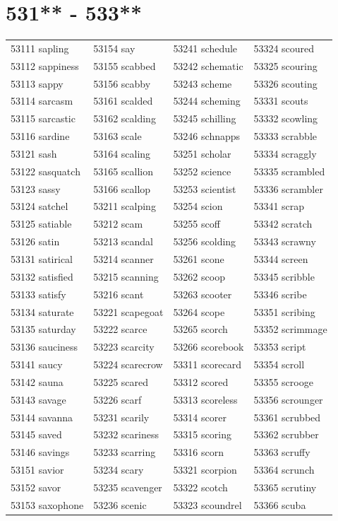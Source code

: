 \documentclass[10pt, oneside]{book}
\begin{document}
\begin{table}
	\centering
	\section*{531** - 533**}
	\begin{tabular}{l l l l}
53111 sapling &53154 say &53241 schedule &53324 scoured\\
53112 sappiness &53155 scabbed &53242 schematic &53325 scouring\\
53113 sappy &53156 scabby &53243 scheme &53326 scouting\\
53114 sarcasm &53161 scalded &53244 scheming &53331 scouts\\
53115 sarcastic &53162 scalding &53245 schilling &53332 scowling\\
53116 sardine &53163 scale &53246 schnapps &53333 scrabble\\
53121 sash &53164 scaling &53251 scholar &53334 scraggly\\
53122 sasquatch &53165 scallion &53252 science &53335 scrambled\\
53123 sassy &53166 scallop &53253 scientist &53336 scrambler\\
53124 satchel &53211 scalping &53254 scion &53341 scrap\\
53125 satiable &53212 scam &53255 scoff &53342 scratch\\
53126 satin &53213 scandal &53256 scolding &53343 scrawny\\
53131 satirical &53214 scanner &53261 scone &53344 screen\\
53132 satisfied &53215 scanning &53262 scoop &53345 scribble\\
53133 satisfy &53216 scant &53263 scooter &53346 scribe\\
53134 saturate &53221 scapegoat &53264 scope &53351 scribing\\
53135 saturday &53222 scarce &53265 scorch &53352 scrimmage\\
53136 sauciness &53223 scarcity &53266 scorebook &53353 script\\
53141 saucy &53224 scarecrow &53311 scorecard &53354 scroll\\
53142 sauna &53225 scared &53312 scored &53355 scrooge\\
53143 savage &53226 scarf &53313 scoreless &53356 scrounger\\
53144 savanna &53231 scarily &53314 scorer &53361 scrubbed\\
53145 saved &53232 scariness &53315 scoring &53362 scrubber\\
53146 savings &53233 scarring &53316 scorn &53363 scruffy\\
53151 savior &53234 scary &53321 scorpion &53364 scrunch\\
53152 savor &53235 scavenger &53322 scotch &53365 scrutiny\\
53153 saxophone &53236 scenic &53323 scoundrel &53366 scuba\\
	\end{tabular}
 \end{table}
\clearpage
\end{document}

